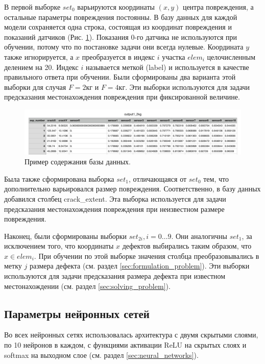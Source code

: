 \documentclass[a4paper,12pt]{article}
\theoremstyle{remark}
\begin{document}
	В первой выборке $set_0$ варьируются координаты $(x, y)$ центра повреждения, а остальные параметры повреждения постоянны. В базу данных для каждой модели сохраняется одна строка, состоящая из координат повреждения и показаний датчиков (Рис. \ref{bd_sample}). Показания 0-го датчика не используются при обучении, потому что по постановке задачи они всегда нулевые. Координата $y$ также игнорируется, а $x$ преобразуется в индекс $i$ участка $elem_i$ целочисленным делением на 20. Индекс $i$ называется меткой (label) и используется в качестве правильного ответа при обучении. Были сформированы два варианта этой выборки для случая $F = 2\text{кг}$ и $F = 4\text{кг}$. Эти выборки используются для задачи предсказания местонахождения повреждения при фиксированной величине.
	\begin{figure}[h]
		\includegraphics[width=\textwidth]{db_sample.png}
		\caption{Пример содержания базы данных.}
		\label{bd_sample}
	\end{figure}

	Была также сформирована выборка $set_1$, отличающаяся от $set_0$ тем, что дополнительно варьировался размер повреждения. 	Соответственно, в базу данных добавился столбец crack\_extent. Эта выборка используется для задачи предсказания местонахождения повреждения при неизвестном размере повреждения.
 
 	Наконец, были сформированы выборки $set_{2i}, i = 0 \dots 9$. Они аналогичны $set_1$, за исключением того, что координаты $x$ дефектов выбирались таким образом, что $x \in elem_i$. При обучении по этой выборке значения столбца преобразовывались в метку $j$ размера дефекта (см. раздел \ref{sec:formulation_problem}). Эти выборки используются для задачи предсказания размера дефекта при известном местонахождении (см. раздел \ref{sec:solving_problem}).
 	
 	\subsection{Параметры нейронных сетей}
 	Во всех нейронных сетях использовалась архитектура с двумя скрытыми слоями, по 10 нейронов в каждом, с функциями активации ReLU на скрытых слоях и softmax на выходном слое (см. раздел \ref{sec:neural_networks}).
 	
\end{document}

